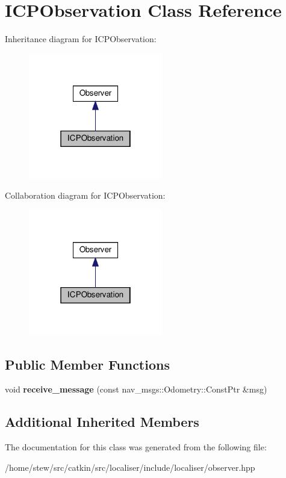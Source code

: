 \hypertarget{classICPObservation}{}\section{I\+C\+P\+Observation Class Reference}
\label{classICPObservation}


Inheritance diagram for I\+C\+P\+Observation\+:
\nopagebreak
\begin{figure}[H]
\begin{center}
\leavevmode
\includegraphics[width=166pt]{classICPObservation__inherit__graph}
\end{center}
\end{figure}


Collaboration diagram for I\+C\+P\+Observation\+:
\nopagebreak
\begin{figure}[H]
\begin{center}
\leavevmode
\includegraphics[width=166pt]{classICPObservation__coll__graph}
\end{center}
\end{figure}
\subsection*{Public Member Functions}
\begin{DoxyCompactItemize}
\item 
\mbox{\label{classICPObservation_ab062de662cf7f05f9c29d99498bf4e88}} 
void {\bfseries receive\+\_\+message} (const nav\+\_\+msgs\+::\+Odometry\+::\+Const\+Ptr \&msg)
\end{DoxyCompactItemize}
\subsection*{Additional Inherited Members}


The documentation for this class was generated from the following file\+:\begin{DoxyCompactItemize}
\item 
/home/stew/src/catkin/src/localiser/include/localiser/observer.\+hpp\end{DoxyCompactItemize}

